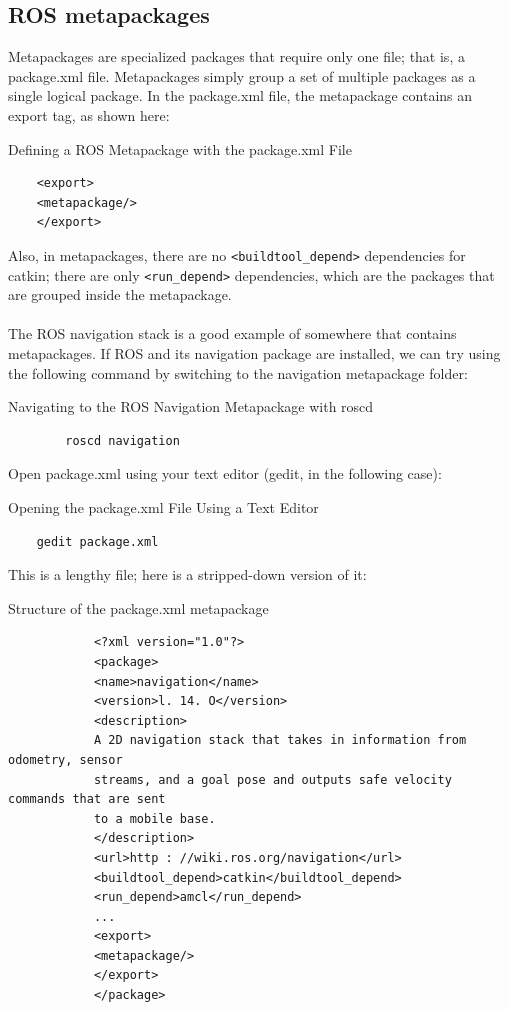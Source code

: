 \documentclass[../../main]{subfiles}
\begin{document}
\subsection{ROS metapackages}
Metapackages are specialized packages that require only one file; that is, a package.xml
file.
Metapackages simply group a set of multiple packages as a single logical package. In the
package.xml file, the metapackage contains an export tag, as shown here:
\begin{codebox}[]{Defining a ROS Metapackage with the package.xml File}
    \begin{verbatim}
    <export>
    <metapackage/>
    </export>
\end{verbatim}
    \end{codebox}
Also, in metapackages, there are no \texttt{<buildtool\_depend>} dependencies for catkin;
there are only \texttt{<run\_depend>} dependencies, which are the packages that are grouped
inside the metapackage.\\
\\
The ROS navigation stack is a good example of somewhere that contains metapackages. If
ROS and its navigation package are installed, we can try using the following command by
switching to the navigation metapackage folder:
\begin{codebox}[]{Navigating to the ROS Navigation Metapackage with roscd}
    \begin{verbatim}
        roscd navigation
    \end{verbatim}
    \end{codebox}
    Open package.xml using your text editor (gedit, in the following case):

    \begin{codebox}[]{Opening the package.xml File Using a Text Editor }
        \begin{verbatim}
    gedit package.xml
        \end{verbatim}
        \end{codebox}

        This is a lengthy file; here is a stripped-down version of it:
\begin{codebox}[]{Structure of the package.xml metapackage}
        \begin{verbatim}
            <?xml version="1.0"?>
            <package>
            <name>navigation</name>
            <version>l. 14. O</version>
            <description>
            A 2D navigation stack that takes in information from odometry, sensor
            streams, and a goal pose and outputs safe velocity commands that are sent
            to a mobile base.
            </description>
            <url>http : //wiki.ros.org/navigation</url>
            <buildtool_depend>catkin</buildtool_depend>
            <run_depend>amcl</run_depend>
            ...
            <export>
            <metapackage/>
            </export>
            </package>
        \end{verbatim}
    \end{codebox}
\end{document}
